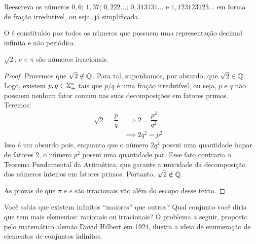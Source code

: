 \begin{exercise}
Reescreva os números $0{,}6$; $1{,}37$; $0{,}222\dots$; $0{,}313131 \dots$ e $1{,}123123123 \dots$ em forma de fração irredutível, ou seja, já simplificada.
\end{exercise}

\begin{definition}
O  é constituído por todos os números que possuem uma representação decimal infinita e não periódica.
\end{definition}

\begin{example}
$\sqrt 2$, $e$ e $\pi$ são números irracionais.
\end{example}

\begin{proof}
Provemos que $\sqrt2 \notin \mathbb{Q}$. Para tal, suponhamos, por absurdo, que $\sqrt2 \in \mathbb{Q}$. Logo, existem $p, q \in \mathbb{Z}^*_+$ tais que $p/q$ é uma fração irredutível, ou seja, $p$ e $q$ não possuem nenhum fator comum nas suas decomposições em fatores primos. Teremos:
%
\begin{equation*}
\begin{aligned}
\sqrt2 = \dfrac{p}{q} & \implies 2 = \dfrac{p^2}{q^2} \\
& \implies 2q^2 = p^2
\end{aligned}
\end{equation*}
%
Isso é um absurdo pois, enquanto que o número $2q^2$ possui uma quantidade ímpar de fatores 2, o número $p^2$ possui uma quantidade par. Esse fato contraria o Teorema Fundamental da Aritmética, que garante a unicidade da decomposição dos números inteiros em fatores primos. Portanto, $\sqrt2 \notin \mathbb{Q}$.

As provas de que $\pi$ e $e$ são irracionais vão além do escopo desse texto. 
\end{proof}

\noindent Você sabia que existem infinitos ``maiores'' que outros? Qual conjunto você diria que tem mais elementos: racionais ou irracionais? O problema a seguir, proposto pelo matemático alemão David Hilbert em 1924, ilustra a ideia de enumeração de elementos de conjuntos infinitos.


